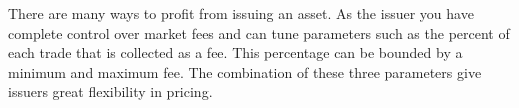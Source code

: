 There are many ways to profit from issuing an asset. As the issuer you have
complete control over market fees and can tune parameters such as the percent
of each trade that is collected as a fee. This percentage can be bounded by a
minimum and maximum fee. The combination of these three parameters give
issuers great flexibility in pricing.
